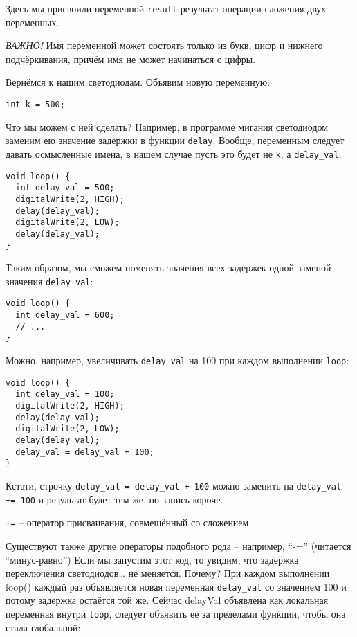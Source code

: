 \documentclass[../sparc.tex]{subfiles}
\begin{document}
Здесь мы присвоили переменной \texttt{result} результат операции сложения двух
переменных.

\emph{ВАЖНО!} Имя переменной может состоять только из букв, цифр и нижнего
подчёркивания, причём имя не может начинаться с цифры.

Вернёмся к нашим светодиодам. Объявим новую переменную:

\begin{verbatim}
int k = 500;
\end{verbatim}

Что мы можем с ней сделать? Например, в программе мигания светодиодом заменим ею
значение задержки в функции \texttt{delay}. Вообще, переменным следует давать
осмысленные имена, в нашем случае пусть это будет не \texttt{k}, а
\texttt{delay\_val}:

\begin{verbatim}
void loop() {
  int delay_val = 500;
  digitalWrite(2, HIGH);
  delay(delay_val);
  digitalWrite(2, LOW);
  delay(delay_val);
}
\end{verbatim}

Таким образом, мы сможем поменять значения всех задержек одной заменой значения
\texttt{delay\_val}:

\begin{verbatim}
void loop() {
  int delay_val = 600;
  // ...
}
\end{verbatim}

Можно, например, увеличивать \texttt{delay\_val} на 100 при каждом выполнении
\texttt{loop}:

\begin{verbatim}
void loop() {
  int delay_val = 100;
  digitalWrite(2, HIGH);
  delay(delay_val);
  digitalWrite(2, LOW);
  delay(delay_val);
  delay_val = delay_val + 100;
}
\end{verbatim}

Кстати, строчку \texttt{delay\_val = delay\_val + 100} можно заменить на
\texttt{delay\_val += 100} и результат будет тем же, но запись короче.

\texttt{+=} -- оператор присваивания, совмещённый со сложением.

Существуют также другие операторы подобного рода -- например, ``-=''
(читается ``минус-равно'') Если мы запустим этот код, то увидим, что задержка
переключения светодиодов… не меняется. Почему? При каждом выполнении loop()
каждый раз объявляется новая переменная \texttt{delay\_val} со значением 100 и
потому задержка остаётся той же. Сейчас delayVal объявлена как локальная
переменная внутри \texttt{loop}, следует объявить её за пределами функции, чтобы
она стала глобальной:
\end{document}

